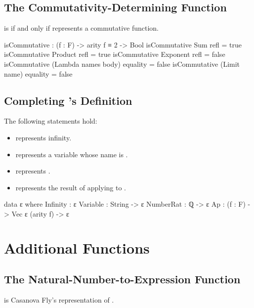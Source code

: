 \documentclass{report}
\begin{document}
\subsection{The Commutativity-Determining Function}
   is  if and only if  represents a commutative function.

\begin{code}
isCommutative : (f : F) -> arity f ≡ 2 -> Bool
isCommutative Sum refl = true
isCommutative Product refl = true
isCommutative Exponent refl = false
isCommutative (Lambda names body) equality = false
isCommutative (Limit name) equality = false
\end{code}

\subsection{Completing 's Definition}
The following statements hold:

\begin{itemize}
  \item {} represents infinity.
  \item {}  represents a variable whose name is .
  \item {}  represents .
  \item {}   represents the result of applying  to .
\end{itemize}

\begin{code}
data ε where
  Infinity : ε
  Variable : String -> ε
  NumberRat : ℚ -> ε
  Ap : (f : F) -> Vec ε (arity f) -> ε
\end{code}

\section{Additional Functions}

\subsection{The Natural-Number-to-Expression Function}
  is Casanova Fly's representation of .
\end{document}
